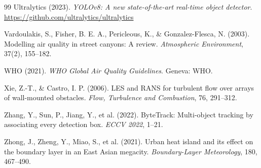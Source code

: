 \documentclass[12pt,a4paper]{article}
\begin{document}
\begin{thebibliography}{99}
Ultralytics (2023). \textit{YOLOv8: A new state-of-the-art real-time object detector}. \url{https://github.com/ultralytics/ultralytics}

Vardoulakis, S., Fisher, B. E. A., Pericleous, K., \& Gonzalez-Flesca, N. (2003). Modelling air quality in street canyons: A review. \textit{Atmospheric Environment}, 37(2), 155--182.

WHO (2021). \textit{WHO Global Air Quality Guidelines}. Geneva: WHO.

Xie, Z.-T., \& Castro, I. P. (2006). LES and RANS for turbulent flow over arrays of wall-mounted obstacles. \textit{Flow, Turbulence and Combustion}, 76, 291--312.

Zhang, Y., Sun, P., Jiang, Y., et al. (2022). ByteTrack: Multi-object tracking by associating every detection box. \textit{ECCV 2022}, 1--21.

Zhong, J., Zheng, Y., Miao, S., et al. (2021). Urban heat island and its effect on the boundary layer in an East Asian megacity. \textit{Boundary-Layer Meteorology}, 180, 467--490.
\end{thebibliography}
\end{document}
